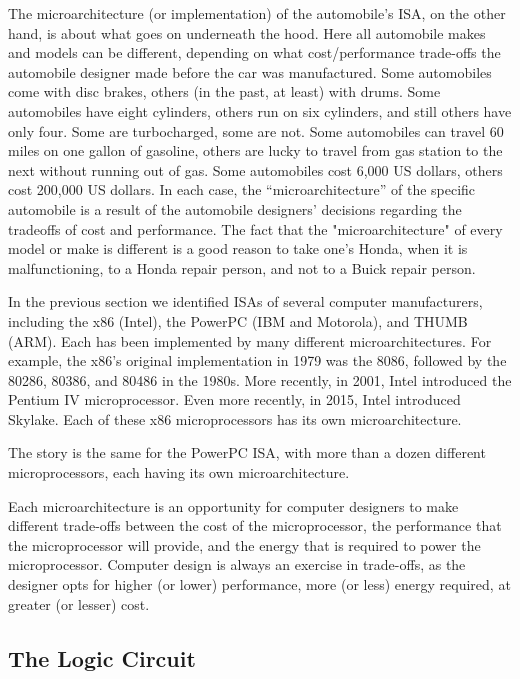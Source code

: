 \documentclass{patt}
\begin{document}
The microarchitecture (or implementation) of the automobile's ISA, on the 
other hand, is about what goes on underneath the hood.  Here all automobile 
makes and models can be different, depending on what cost/performance 
trade-offs the automobile designer made before the car was manufactured.  
Some automobiles come with disc brakes, others (in the past, at least) with 
drums.  Some automobiles have eight cylinders, others run on six cylinders, 
and still others have only four.  Some are turbocharged, some are not.  
Some automobiles can travel 60 miles on one gallon of gasoline, others are
lucky to travel from gas station to the next without running out of gas.
Some automobiles cost 6,000 US dollars, others cost 200,000 US dollars.
In each case, the \nobreak ``microarchitecture'' of the specific automobile 
is a result of the automobile designers' decisions regarding the tradeoffs 
of cost and performance.  The fact that the "microarchitecture" of every model 
or make is different is a good reason to take one's Honda, when it is 
malfunctioning, to a Honda repair person, and not to a Buick repair person.

In the previous section we identified ISAs of several computer manufacturers, 
including the x86 (Intel), the PowerPC (IBM and Motorola), and THUMB (ARM).
Each has been implemented by many different 
microarchitectures.  
For example, the x86's original implementation in 1979 was the 8086, 
followed by the 80286, 80386, and 80486 in the 1980s.  More recently, in 2001, 
Intel introduced the Pentium IV microprocessor.  Even more recently, in 2015, 
Intel introduced Skylake.  Each of these x86 microprocessors has its own 
microarchitecture.

The story is the same for the PowerPC ISA, with more than a dozen 
different microprocessors, each having its own microarchitecture.  

Each microarchitecture is an opportunity for computer designers to make 
different trade-offs between the cost of the microprocessor, the performance 
that the microprocessor will provide, and the energy that is required to power 
the microprocessor.  Computer design is always an exercise in trade-offs, 
as the designer opts for higher (or lower) performance, more (or less) energy 
required, at greater (or lesser) cost.

\subsection{The Logic Circuit}
\end{document}
